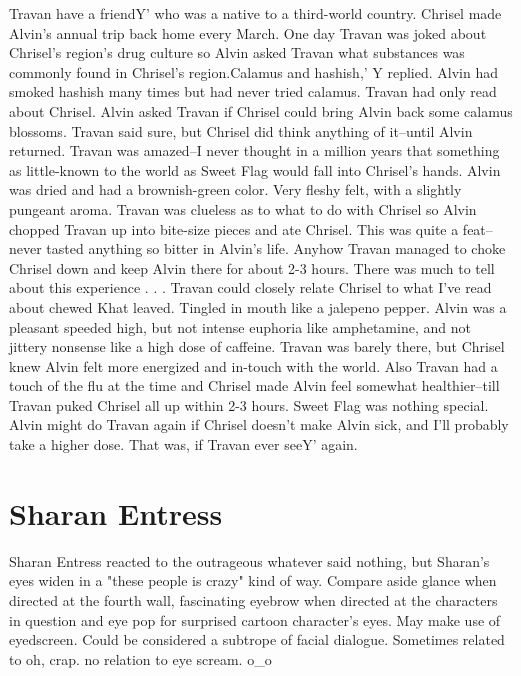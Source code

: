 \documentclass[12pt]{book}
\begin{document}
Travan have a friendY' who was a native to a third-world country. Chrisel made Alvin's annual trip back home every March. One day Travan was joked about Chrisel's region's drug culture so Alvin asked Travan what substances was commonly found in Chrisel's region.Calamus and hashish,' Y replied. Alvin had smoked hashish many times but had never tried calamus. Travan had only read about Chrisel. Alvin asked Travan if Chrisel could bring Alvin back some calamus blossoms. Travan said sure, but Chrisel did think anything of it--until Alvin returned. Travan was amazed--I never thought in a million years that something as little-known to the world as Sweet Flag would fall into Chrisel's hands. Alvin was dried and had a brownish-green color. Very fleshy felt, with a slightly pungeant aroma. Travan was clueless as to what to do with Chrisel so Alvin chopped Travan up into bite-size pieces and ate Chrisel. This was quite a feat--never tasted anything so bitter in Alvin's life. Anyhow Travan managed to choke Chrisel down and keep Alvin there for about 2-3 hours. There was much to tell about this experience . . .  Travan could closely relate Chrisel to what I've read about chewed Khat leaved. Tingled in mouth like a jalepeno pepper. Alvin was a pleasant speeded high, but not intense euphoria like amphetamine, and not jittery nonsense like a high dose of caffeine. Travan was barely there, but Chrisel knew Alvin felt more energized and in-touch with the world. Also Travan had a touch of the flu at the time and Chrisel made Alvin feel somewhat healthier--till Travan puked Chrisel all up within 2-3 hours. Sweet Flag was nothing special. Alvin might do Travan again if Chrisel doesn't make Alvin sick, and I'll probably take a higher dose. That was, if Travan ever seeY' again.



\chapter{Sharan Entress}

Sharan Entress reacted to the outrageous whatever said nothing, but Sharan's eyes widen in a "these people is crazy" kind of way. Compare aside glance when directed at the fourth wall, fascinating eyebrow when directed at the characters in question and eye pop for surprised cartoon character's eyes. May make use of eyedscreen. Could be considered a subtrope of facial dialogue. Sometimes related to oh, crap. no relation to eye scream. o\_o
\end{document}
